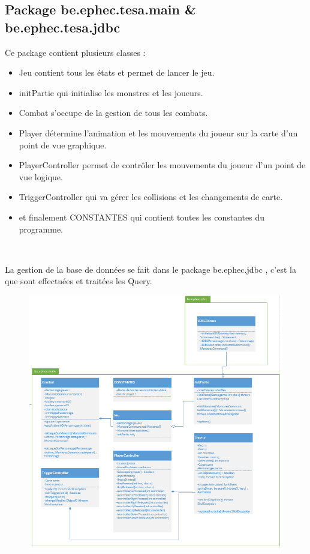 \documentclass[a4paper,titlepage]{article}
\begin{document}
	\subsection{Package \og be.ephec.tesa.main \fg{} \& \og be.ephec.tesa.jdbc \fg{} }
	Ce package contient plusieurs classes :
	\begin{itemize}

		\item \og Jeu \fg{} contient tous les états et permet de lancer le jeu.
		\item \og initPartie \fg{} qui initialise les monstres et les joueurs.
		\item \og Combat \fg{} s'occupe de la gestion de tous les combats.
		\item \og Player \fg{} détermine l'animation et les mouvements du joueur sur la carte d'un point de vue graphique.
		\item \og PlayerController \fg{} permet de contrôler les mouvements du joueur d'un point de vue logique.
		\item \og TriggerController \fg{} qui va gérer les collisions et les changements de carte.
		\item et finalement \og CONSTANTES \fg{} qui contient toutes les constantes du programme.
	\end{itemize}	
	\ 
		
	La gestion de la base de données se fait dans le package \og be.ephec.jdbc \fg{}, c'est la que sont effectuées et traitées les Query.	
	\ \\
	\begin{figure}[h!]
		\includegraphics[scale=0.85]{Pjdbc&Pmain.png}
	\end{figure}
\end{document}
